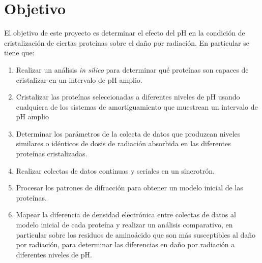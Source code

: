 \documentclass[11pt,letterpaper]{article}
\begin{document}
	\section{Objetivo}
	El objetivo de este proyecto es determinar el efecto del pH en la condición de cristalización de ciertas proteínas sobre el daño por radiación. En particular se tiene que:
	\begin{enumerate}
		\item Realizar un análisis \emph{in silico} para determinar qué proteínas son capaces de cristalizar en un intervalo de pH amplio.
		\item Cristalizar las proteínas seleccionadas a diferentes niveles de pH usando cualquiera de los sistemas de amortiguamiento que muestrean un intervalo de pH amplio
		\item Determinar los parámetros de la colecta de datos que produzcan niveles similares o idénticos de dosis de radiación absorbida en las diferentes proteínas cristalizadas.
		\item Realizar colectas de datos continuas y seriales en un sincrotrón.
		\item Procesar los patrones de difracción para obtener un modelo inicial de las proteínas.
		\item Mapear la diferencia de densidad electrónica entre colectas de datos al modelo inicial de cada proteína y realizar un análisis comparativo, en particular sobre los residuos de aminoácido que son más susceptibles al daño por radiación, para determinar las diferencias en daño por radiación a diferentes niveles de pH.
	\end{enumerate}	
	
\end{document}

